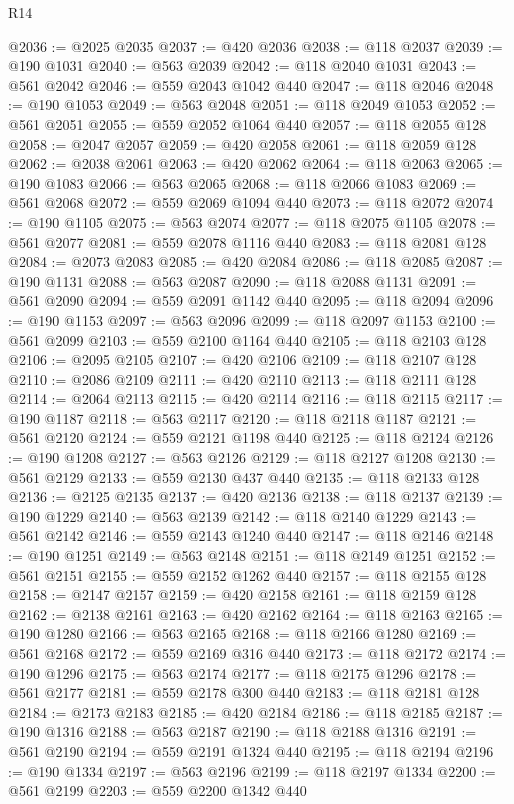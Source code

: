 \begin{lexlean}{R14}
\begin{coremodule}
@2036 := @2025 @2035
@2037 := @420 @2036
@2038 := @118 @2037
@2039 := @190 @1031
@2040 := @563 @2039
@2042 := @118 @2040 @1031
@2043 := @561 @2042
@2046 := @559 @2043 @1042 @440
@2047 := @118 @2046
@2048 := @190 @1053
@2049 := @563 @2048
@2051 := @118 @2049 @1053
@2052 := @561 @2051
@2055 := @559 @2052 @1064 @440
@2057 := @118 @2055 @128
@2058 := @2047 @2057
@2059 := @420 @2058
@2061 := @118 @2059 @128
@2062 := @2038 @2061
@2063 := @420 @2062
@2064 := @118 @2063
@2065 := @190 @1083
@2066 := @563 @2065
@2068 := @118 @2066 @1083
@2069 := @561 @2068
@2072 := @559 @2069 @1094 @440
@2073 := @118 @2072
@2074 := @190 @1105
@2075 := @563 @2074
@2077 := @118 @2075 @1105
@2078 := @561 @2077
@2081 := @559 @2078 @1116 @440
@2083 := @118 @2081 @128
@2084 := @2073 @2083
@2085 := @420 @2084
@2086 := @118 @2085
@2087 := @190 @1131
@2088 := @563 @2087
@2090 := @118 @2088 @1131
@2091 := @561 @2090
@2094 := @559 @2091 @1142 @440
@2095 := @118 @2094
@2096 := @190 @1153
@2097 := @563 @2096
@2099 := @118 @2097 @1153
@2100 := @561 @2099
@2103 := @559 @2100 @1164 @440
@2105 := @118 @2103 @128
@2106 := @2095 @2105
@2107 := @420 @2106
@2109 := @118 @2107 @128
@2110 := @2086 @2109
@2111 := @420 @2110
@2113 := @118 @2111 @128
@2114 := @2064 @2113
@2115 := @420 @2114
@2116 := @118 @2115
@2117 := @190 @1187
@2118 := @563 @2117
@2120 := @118 @2118 @1187
@2121 := @561 @2120
@2124 := @559 @2121 @1198 @440
@2125 := @118 @2124
@2126 := @190 @1208
@2127 := @563 @2126
@2129 := @118 @2127 @1208
@2130 := @561 @2129
@2133 := @559 @2130 @437 @440
@2135 := @118 @2133 @128
@2136 := @2125 @2135
@2137 := @420 @2136
@2138 := @118 @2137
@2139 := @190 @1229
@2140 := @563 @2139
@2142 := @118 @2140 @1229
@2143 := @561 @2142
@2146 := @559 @2143 @1240 @440
@2147 := @118 @2146
@2148 := @190 @1251
@2149 := @563 @2148
@2151 := @118 @2149 @1251
@2152 := @561 @2151
@2155 := @559 @2152 @1262 @440
@2157 := @118 @2155 @128
@2158 := @2147 @2157
@2159 := @420 @2158
@2161 := @118 @2159 @128
@2162 := @2138 @2161
@2163 := @420 @2162
@2164 := @118 @2163
@2165 := @190 @1280
@2166 := @563 @2165
@2168 := @118 @2166 @1280
@2169 := @561 @2168
@2172 := @559 @2169 @316 @440
@2173 := @118 @2172
@2174 := @190 @1296
@2175 := @563 @2174
@2177 := @118 @2175 @1296
@2178 := @561 @2177
@2181 := @559 @2178 @300 @440
@2183 := @118 @2181 @128
@2184 := @2173 @2183
@2185 := @420 @2184
@2186 := @118 @2185
@2187 := @190 @1316
@2188 := @563 @2187
@2190 := @118 @2188 @1316
@2191 := @561 @2190
@2194 := @559 @2191 @1324 @440
@2195 := @118 @2194
@2196 := @190 @1334
@2197 := @563 @2196
@2199 := @118 @2197 @1334
@2200 := @561 @2199
@2203 := @559 @2200 @1342 @440

\end{coremodule}
\end{lexlean}
